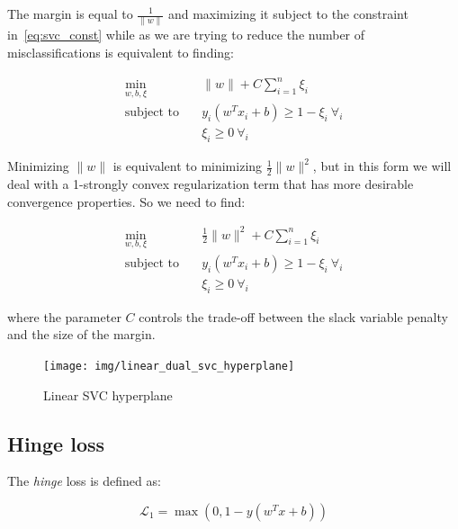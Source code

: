 The margin is equal to $\displaystyle \frac{1}{\| w \|}$ and maximizing it subject to the constraint in~\eqref{eq:svc_const} while as we are trying to reduce the number of misclassifications is equivalent to finding:

\begin{equation} \label{eq:svc_obj}
    \begin{aligned}
        \min_{w,b,\xi} \quad & \| w \| + C \sum_{i=1}^n \xi_i \\
            \text{subject to} \quad & y_i (w^T x_i + b) \geq 1 - \xi_i \ \forall_i \\ & \xi_i \geq 0 \ \forall_i
    \end{aligned}
\end{equation}

Minimizing $\| w \|$ is equivalent to minimizing $\displaystyle \frac{1}{2} \| w \|^2$, but in this form we will deal with a 1-strongly convex regularization term that has more desirable convergence properties. So we need to find:

\begin{equation} \label{eq:quad_svc_obj}
    \begin{aligned}
        \min_{w,b,\xi} \quad & \frac{1}{2} \| w \|^2 + C \sum_{i=1}^n \xi_i \\
            \text{subject to} \quad & y_i (w^T x_i + b) \geq 1 - \xi_i \ \forall_i \\ & \xi_i \geq 0 \ \forall_i
    \end{aligned}
\end{equation}

where the parameter $C$ controls the trade-off between the slack variable penalty and the size of the margin.

\begin{figure}[h!]
	\centering
	\texttt{[image: img/linear\_dual\_svc\_hyperplane]}
	\caption{Linear SVC hyperplane}
	\label{fig:linear_dual_svc_hyperplane}
\end{figure}

\pagebreak

\subsection{Hinge loss}

The \emph{hinge} loss is defined as:

\begin{equation} \label{eq:hinge_loss1}
	\mathcal{L}_1 = \max(0, 1 - y (w^T x + b))
\end{equation}

